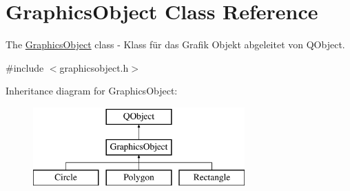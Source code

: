 \hypertarget{class_graphics_object}{}\section{Graphics\+Object Class Reference}
\label{class_graphics_object}


The \hyperlink{class_graphics_object}{Graphics\+Object} class -\/ Klass für das Grafik Objekt abgeleitet von Q\+Object.  




{\ttfamily \#include $<$graphicsobject.\+h$>$}

Inheritance diagram for Graphics\+Object\+:\begin{figure}[H]
\begin{center}
\leavevmode
\includegraphics[height=3.000000cm]{class_graphics_object}
\end{center}
\end{figure}
